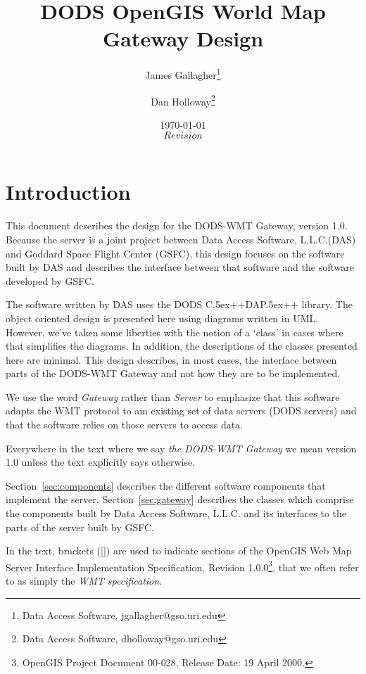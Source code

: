 \documentclass{article}
\newcommand{\Cpp}{{\rm {\small C}\raise.5ex\hbox{\footnotesize ++}}\xspace}
\newcommand{\DAP}{{\rm {\small DAP}\raise.5ex\hbox{\footnotesize ++}}\xspace}
\newcommand{\DASllc}{Data Access Software, {\footnotesize {\sc L.L.C.}}\xspace}
\begin{document}
\title{DODS OpenGIS World Map Gateway Design}
\author{James Gallagher\thanks{Data Access Software, jgallagher@gso.uri.edu}
        \and Dan Holloway\thanks{Data Access Software, dholloway@gso.uri.edu}}

\date{\today \\ $Revision$ }

%

\maketitle
\tableofcontents

\section{Introduction}

This document describes the design for the DODS-WMT Gateway, version
1.0. Because the server is a joint project between \DASllc (DAS) and Goddard
Space Flight Center (GSFC), this design focuses on the software built by DAS
and describes the interface between that software and the software developed
by GSFC.

The software written by DAS uses the DODS \Cpp \DAP library. The object
oriented design is presented here using diagrams written in UML.  However,
we've taken some liberties with the notion of a `class' in cases where
that simplifies the diagrams. In addition, the descriptions of the classes
presented here are minimal. This design describes, in most cases, the
interface between parts of the DODS-WMT Gateway and not how they are to be
implemented.

We use the word \emph{Gateway} rather than \emph{Server} to emphasize that
this software adapts the WMT protocol to am existing set of data servers
(DODS servers) and that the software relies on those servers to access data.

Everywhere in the text where we say \emph{the DODS-WMT Gateway} we mean
version 1.0 unless the text explicitly says otherwise.

Section~\ref{sec:components} describes the different software components that
implement the server. Section~\ref{sec:gateway} describes the classes which
comprise the components built by \DASllc and its interfaces to the parts of
the server built by GSFC.

In the text, brackets ([]) are used to indicate sections of the OpenGIS Web
Map Server Interface Implementation Specification, Revision
1.0.0\footnote{OpenGIS Project Document 00-028, Release Date: 19 April
  2000.}, that we often refer to as simply the \emph{WMT specification}.
\end{document}

